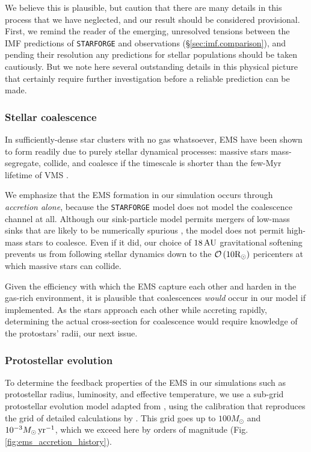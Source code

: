 \documentclass[apjl,twocolumn]{openjournal}
\begin{document}
We believe this is plausible, but caution that there are many details in this process that we have neglected, and our result should be considered provisional. First, we remind the reader of the emerging, unresolved tensions between the IMF predictions of \texttt{STARFORGE} and observations (\S\ref{sec:imf.comparison}), and pending their resolution any predictions for stellar populations should be taken cautiously. But we note here several outstanding details in this physical picture that certainly require further investigation before a reliable prediction can be made.

\subsubsection{Stellar coalescence}
In sufficiently-dense star clusters with no gas whatsoever, EMS have been shown to form readily due to purely stellar dynamical processes: massive stars mass-segregate, collide, and coalesce if the timescale is shorter than the few-Myr lifetime of VMS \citep{portegies_zwart_1999_runaway_mergers,portegies-zwart:2002,reinoso:2018.primordial.cluster.collisions,reinoso:2020.star.cluster.runaway.collisions,alister-seguel:2020.smbh.seeds.pop3.collisions,vergara:2021.pop3.stellar.collisions,vergara:2023.runaway.collisions.nuclear.clusters,gonzalez.prieto:2024.stellar.collisions,vergara:2024.bh.formation.collisions,vergara:2025.vms.runaway.collisions}.

We emphasize that the EMS formation in our simulation occurs through {\it accretion alone}, because the \texttt{STARFORGE} model does not model the coalescence channel at all. Although our sink-particle model permits mergers of low-mass sinks that are likely to be numerically spurious \citep{starforge.methods}, the model does not permit high-mass stars to coalesce. Even if it did, our choice of $18\,\rm AU$ gravitational softening prevents us from following stellar dynamics down to the $\mathcal{O}\left(10\rm R_\odot\right)$ pericenters at which massive stars can collide. 

Given the efficiency with which the EMS capture each other and harden in the gas-rich environment, it is plausible that coalescences {\it would} occur in our model if implemented. As the stars approach each other while accreting rapidly, determining the actual cross-section for coalescence would require knowledge of the protostars' radii, our next issue.

\subsubsection{Protostellar evolution}
\label{sec:protostellar.evol}
To determine the feedback properties of the EMS in our simulations such as protostellar radius, luminosity, and effective temperature, we use a sub-grid protostellar evolution model adapted from \citep{Offner_2009_radiative_sim}, using the calibration that reproduces the grid of detailed calculations by \citet{hosokawa:2009.protostellar.evol}. This grid goes up to $100M_\odot$ and $10^{-3}M_\odot\,\rm yr^{-1}$, which we exceed here by orders of magnitude (Fig. \ref{fig:ems_accretion_history}).
\end{document}
